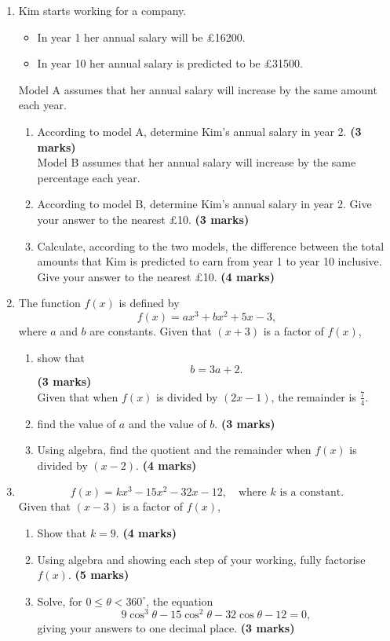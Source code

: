 \documentclass{../Templates/sbs-exam}
\newcommand{\imarks}[1]{\hfill \textbf{(#1 marks)}}
\begin{document}
\begin{enumerate}
\newpage

\item %
Kim starts working for a company.
\begin{itemize}
    \item In year 1 her annual salary will be £16200.
    \item In year 10 her annual salary is predicted to be £31500.
\end{itemize}
Model A assumes that her annual salary will increase by the same amount each year.
\begin{enumerate}
    \item[(a)] According to model A, determine Kim's annual salary in year 2. \imarks{3}\\
    Model B assumes that her annual salary will increase by the same percentage each year.\\
    \item[(b)] According to model B, determine Kim's annual salary in year 2. Give your answer to the nearest £10. \imarks{3}
    \item[(c)] Calculate, according to the two models, the difference between the total amounts that Kim is predicted to earn from year 1 to year 10 inclusive. Give your answer to the nearest £10. \imarks{4}
\end{enumerate}

\newpage

\item %
The function $f(x)$ is defined by
\[
f(x) = ax^{3} + bx^{2} + 5x - 3,
\]
where $a$ and $b$ are constants. Given that $(x+3)$ is a factor of $f(x)$,
\begin{enumerate}
    \item[(a)] show that
    \[
    b = 3a + 2.
    \] \imarks{3}\\
    Given that when $f(x)$ is divided by $(2x-1)$, the remainder is $\frac{7}{4}$.\\
    \item[(b)] find the value of $a$ and the value of $b$. \imarks{3}
    \item[(c)] Using algebra, find the quotient and the remainder when $f(x)$ is divided by $(x-2)$. \imarks{4}
\end{enumerate}

\newpage

\item %
\[
f(x) = kx^{3} - 15x^{2} - 32x - 12, \quad \text{where } k \text{ is a constant}.
\]
Given that $(x-3)$ is a factor of $f(x)$,
\begin{enumerate}
    \item[(a)] Show that $k=9$. \imarks{4}
    \item[(b)] Using algebra and showing each step of your working, fully factorise $f(x)$. \imarks{5}
    \item[(c)] Solve, for $0 \leq \theta < 360^{\circ}$, the equation
    \[
    9\cos^{3}\theta - 15\cos^{2}\theta - 32\cos\theta - 12 = 0,
    \]
    giving your answers to one decimal place. \imarks{3}
\end{enumerate}

\end{enumerate}
\end{document}
